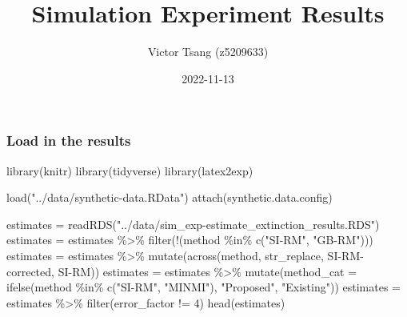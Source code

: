 \documentclass[
]{article}
\title{Simulation Experiment Results}
\author{Victor Tsang (z5209633)}
\date{2022-11-13}
\newenvironment{Shaded}{\begin{snugshade}}{\end{snugshade}}
\newcommand{\AttributeTok}[1]{\textcolor[rgb]{0.77,0.63,0.00}{#1}}
\newcommand{\DecValTok}[1]{\textcolor[rgb]{0.00,0.00,0.81}{#1}}
\newcommand{\FunctionTok}[1]{\textcolor[rgb]{0.00,0.00,0.00}{#1}}
\newcommand{\NormalTok}[1]{#1}
\newcommand{\OtherTok}[1]{\textcolor[rgb]{0.56,0.35,0.01}{#1}}
\newcommand{\SpecialCharTok}[1]{\textcolor[rgb]{0.00,0.00,0.00}{#1}}
\newcommand{\StringTok}[1]{\textcolor[rgb]{0.31,0.60,0.02}{#1}}
\begin{document}
\maketitle

\hypertarget{load-in-the-results}{%
\subsubsection{Load in the results}\label{load-in-the-results}}

\begin{Shaded}
\begin{Highlighting}[]
\FunctionTok{library}\NormalTok{(knitr)}
\FunctionTok{library}\NormalTok{(tidyverse)}
\FunctionTok{library}\NormalTok{(latex2exp)}

\FunctionTok{load}\NormalTok{(}\StringTok{"../data/synthetic{-}data.RData"}\NormalTok{)}
\FunctionTok{attach}\NormalTok{(synthetic.data.config)}

\NormalTok{estimates }\OtherTok{=} \FunctionTok{readRDS}\NormalTok{(}\StringTok{"../data/sim\_exp{-}estimate\_extinction\_results.RDS"}\NormalTok{)}
\NormalTok{estimates }\OtherTok{=}\NormalTok{ estimates }\SpecialCharTok{\%\textgreater{}\%} \FunctionTok{filter}\NormalTok{(}\SpecialCharTok{!}\NormalTok{(method }\SpecialCharTok{\%in\%} \FunctionTok{c}\NormalTok{(}\StringTok{"SI{-}RM"}\NormalTok{, }\StringTok{"GB{-}RM"}\NormalTok{)))}
\NormalTok{estimates }\OtherTok{=}\NormalTok{ estimates }\SpecialCharTok{\%\textgreater{}\%} \FunctionTok{mutate}\NormalTok{(}\FunctionTok{across}\NormalTok{(method, str\_replace, }\StringTok{\textquotesingle{}SI{-}RM{-}corrected\textquotesingle{}}\NormalTok{, }\StringTok{\textquotesingle{}SI{-}RM\textquotesingle{}}\NormalTok{))}
\NormalTok{estimates }\OtherTok{=}\NormalTok{ estimates }\SpecialCharTok{\%\textgreater{}\%} \FunctionTok{mutate}\NormalTok{(}\AttributeTok{method\_cat =} \FunctionTok{ifelse}\NormalTok{(method }\SpecialCharTok{\%in\%} \FunctionTok{c}\NormalTok{(}\StringTok{"SI{-}RM"}\NormalTok{, }\StringTok{"MINMI"}\NormalTok{), }\StringTok{"Proposed"}\NormalTok{, }\StringTok{"Existing"}\NormalTok{))}
\NormalTok{estimates }\OtherTok{=}\NormalTok{ estimates }\SpecialCharTok{\%\textgreater{}\%} \FunctionTok{filter}\NormalTok{(error\_factor }\SpecialCharTok{!=} \DecValTok{4}\NormalTok{)}
\FunctionTok{head}\NormalTok{(estimates)}
\end{Highlighting}
\end{Shaded}
\end{document}
